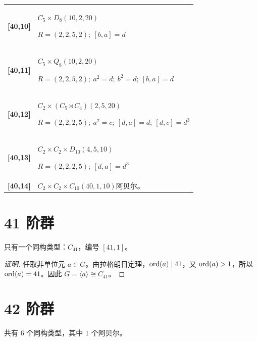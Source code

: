 \documentclass[UTF8,fontset=fandol,11pt,a4paper]{ctexart}
\begin{document}
\begin{longtable}{@{}p{17mm}>{\raggedright\arraybackslash}p{141mm}@{}}
\textbf{[40,10]} & $C_{5}\times D_{8}$\quad $(10,2,20)$\par\(R=(2,2,5,2);\allowbreak\ [b,a]=d\)\\[3pt]

\textbf{[40,11]} & $C_{5}\times Q_{8}$\quad $(10,2,20)$\par\(R=(2,2,5,2);\allowbreak\ a^{2}=d;\allowbreak\ b^{2}=d;\allowbreak\ [b,a]=d\)\\[3pt]

\textbf{[40,12]} & $C_{2}\times (C_{5}\rtimes C_{4})$\quad $(2,5,20)$\par\(R=(2,2,2,5);\allowbreak\ a^{2}=c;\allowbreak\ [d,a]=d;\allowbreak\ [d,c]=d^{3}\)\\[3pt]

\textbf{[40,13]} & $C_{2}\times C_{2}\times D_{10}$\quad $(4,5,10)$\par\(R=(2,2,2,5);\allowbreak\ [d,a]=d^{3}\)\\[3pt]

\textbf{[40,14]} & $C_{2}\times C_{2}\times C_{10}$\quad $(40,1,10)$\quad 阿贝尔。\\[3pt]

\end{longtable}\endgroup

\section*{41 阶群}\label{order:41}

只有一个同构类型：$C_{41}$，编号 $[41,1]$。

\begin{proof}[证明]
任取非单位元 $a\in G$。由拉格朗日定理，$\operatorname{ord}(a)\mid 41$，又 $\operatorname{ord}(a)>1$，所以 $\operatorname{ord}(a)=41$。因此 $G=\langle a\rangle\cong C_{41}$。
\end{proof}

\section*{42 阶群}\label{order:42}

共有 $6$ 个同构类型，其中 $1$ 个阿贝尔。

\begingroup\small\setlength{\tabcolsep}{3pt}\renewcommand{\arraystretch}{1.12}
\end{document}
